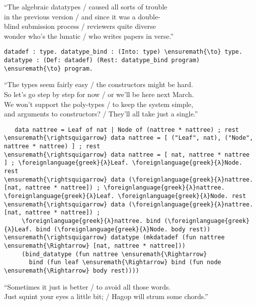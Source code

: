 \importantCodeblockEnd{}

\begin{versy}
``The algebraic datatypes / caused all sorts of trouble \\
in the previous version / and since it was a double- \\
blind submission process / reviewers quite diverse \\
wonder who's the lunatic / who writes papers in verse.''
\end{versy}

\begin{verbatim}
datadef : type. datatype_bind : (Into: type) \ensuremath{\to} type.
datatype : (Def: datadef) (Rest: datatype_bind program) \ensuremath{\to} program.
\end{verbatim}

\begin{versy}
``The types seem fairly easy / the constructors might be hard. \\
So let's go step by step for now / or we'll be here next March. \\
We won't support the poly-types / to keep the system simple, \\
and arguments to constructors? / They'll all take just a single.''
\end{versy}

\begin{verbatim}
   data nattree = Leaf of nat | Node of (nattree * nattree) ; rest
\ensuremath{\rightsquigarrow} data nattree = [ ("Leaf", nat), ("Node", nattree * nattree) ] ; rest
\ensuremath{\rightsquigarrow} data nattree = [ nat, nattree * nattree ] ; \foreignlanguage{greek}{λ}Leaf. \foreignlanguage{greek}{λ}Node. rest
\ensuremath{\rightsquigarrow} data (\foreignlanguage{greek}{λ}nattree. [nat, nattree * nattree]) ; \foreignlanguage{greek}{λ}nattree. \foreignlanguage{greek}{λ}Leaf. \foreignlanguage{greek}{λ}Node. rest
\ensuremath{\rightsquigarrow} data (\foreignlanguage{greek}{λ}nattree. [nat, nattree * nattree]) ;
     \foreignlanguage{greek}{λ}nattree. bind (\foreignlanguage{greek}{λ}Leaf. bind (\foreignlanguage{greek}{λ}Node. body rest))
\ensuremath{\rightsquigarrow} datatype (mkdatadef (fun nattree \ensuremath{\Rightarrow} [nat, nattree * nattree]))
     (bind_datatype (fun nattree \ensuremath{\Rightarrow}
       bind (fun leaf \ensuremath{\Rightarrow} bind (fun node \ensuremath{\Rightarrow} body rest))))
\end{verbatim}

\begin{versy}
``Sometimes it just is better / to avoid all those words. \\
Just squint your eyes a little bit; / Hagop will strum some chords.''
\end{versy}

